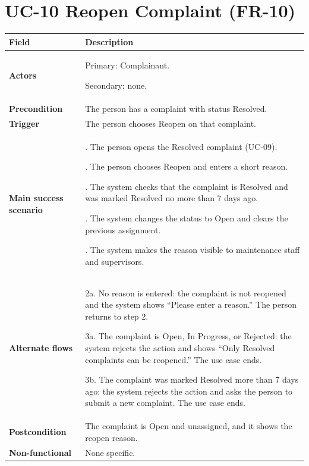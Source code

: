 \documentclass[11pt,a4paper]{report}
\begin{document}
\section{UC-10 Reopen Complaint (FR-10)}
\begin{longtable}{|>{\raggedright\arraybackslash}p{3.0cm}|>{\raggedright\arraybackslash}p{12.4cm}|}
\hline \textbf{Field} & \textbf{Description} \\ \hline \endhead
\textbf{Actors} & Primary: Complainant.\par\smallskip Secondary: none. \\ \hline
\textbf{Precondition} & The person has a complaint with status Resolved. \\ \hline
\textbf{Trigger} & The person chooses Reopen on that complaint. \\ \hline
\textbf{Main success scenario} & 1. The person opens the Resolved complaint (UC-09).\par\smallskip 2. The person chooses Reopen and enters a short reason.\par\smallskip 3. The system checks that the complaint is Resolved and was marked Resolved no more than 7 days ago.\par\smallskip 4. The system changes the status to Open and clears the previous assignment.\par\smallskip 5. The system makes the reason visible to maintenance staff and supervisors. \\ \hline
\textbf{Alternate flows} & 2a. No reason is entered: the complaint is not reopened and the system shows ``Please enter a reason.'' The person returns to step 2.\par\smallskip 3a. The complaint is Open, In Progress, or Rejected: the system rejects the action and shows ``Only Resolved complaints can be reopened.'' The use case ends.\par\smallskip 3b. The complaint was marked Resolved more than 7 days ago: the system rejects the action and asks the person to submit a new complaint. The use case ends. \\ \hline
\textbf{Postcondition} & The complaint is Open and unassigned, and it shows the reopen reason. \\ \hline
\textbf{Non-functional} & None specific. \\ \hline
\end{longtable}
\end{document}

